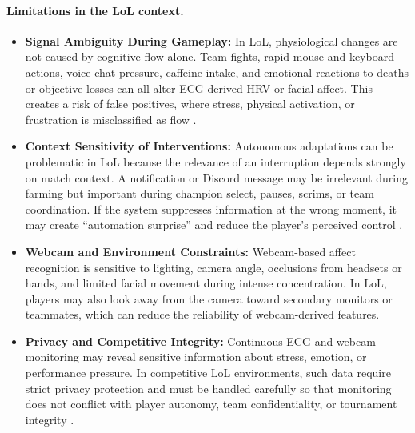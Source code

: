 \paragraph{Limitations in the LoL context.}
\begin{itemize}
    \item \textbf{Signal Ambiguity During Gameplay:} In LoL, physiological changes are not caused by cognitive flow alone. Team fights, rapid mouse and keyboard actions, voice-chat pressure, caffeine intake, and emotional reactions to deaths or objective losses can all alter ECG-derived HRV or facial affect. This creates a risk of false positives, where stress, physical activation, or frustration is misclassified as flow \autocite{fairclough2009fundamentals}.
    \item \textbf{Context Sensitivity of Interventions:} Autonomous adaptations can be problematic in LoL because the relevance of an interruption depends strongly on match context. A notification or Discord message may be irrelevant during farming but important during champion select, pauses, scrims, or team coordination. If the system suppresses information at the wrong moment, it may create \enquote{automation surprise} and reduce the player's perceived control \autocite{ubt_eref88160}.
    \item \textbf{Webcam and Environment Constraints:} Webcam-based affect recognition is sensitive to lighting, camera angle, occlusions from headsets or hands, and limited facial movement during intense concentration. In LoL, players may also look away from the camera toward secondary monitors or teammates, which can reduce the reliability of webcam-derived features.
    \item \textbf{Privacy and Competitive Integrity:} Continuous ECG and webcam monitoring may reveal sensitive information about stress, emotion, or performance pressure. In competitive LoL environments, such data require strict privacy protection and must be handled carefully so that monitoring does not conflict with player autonomy, team confidentiality, or tournament integrity \autocite{fairclough2009fundamentals}.
\end{itemize}

